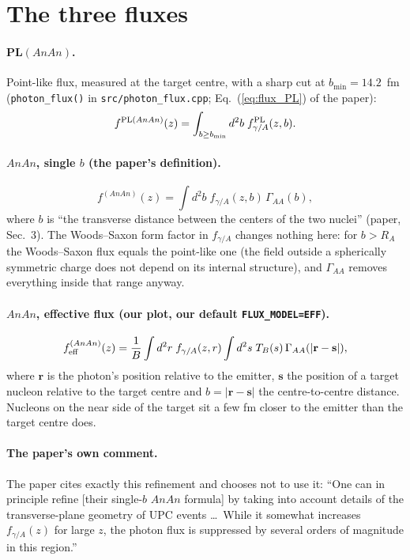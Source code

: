 \documentclass[11pt]{article}
\begin{document}
\section{The three fluxes}

\paragraph{PL$(AnAn)$.} Point-like flux, measured at the target centre,
with a sharp cut at $b_{\min}=14.2$~fm (\texttt{photon\_flux()} in
\texttt{src/photon\_flux.cpp}; Eq.~(\ref{eq:flux_PL}) of the paper):
\begin{equation}
  f^{{\rm PL}(AnAn)}(z) = \int_{b\ge b_{\min}} d^2b\; f^{\rm PL}_{\gamma/A}(z,b).
  \label{eq:flux_PL}
\end{equation}

\paragraph{$AnAn$, single $b$ (the paper's definition).}
\begin{equation}
  f^{(AnAn)}(z) = \int d^2b\; f_{\gamma/A}(z,b)\,\Gamma_{AA}(b),
\end{equation}
where $b$ is ``the transverse distance between the centers of the two
nuclei'' (paper, Sec.~3). The Woods--Saxon form factor in $f_{\gamma/A}$
changes nothing here: for $b>R_A$ the Woods--Saxon flux equals the
point-like one (the field outside a spherically symmetric charge does not
depend on its internal structure), and $\Gamma_{AA}$ removes everything
inside that range anyway.

\paragraph{$AnAn$, effective flux (our plot, our default \texttt{FLUX\_MODEL=EFF}).}
\begin{equation}
  f^{(AnAn)}_{\rm eff}(z) = \frac{1}{B}\int d^2r\; f_{\gamma/A}(z,r)
  \int d^2s\; T_B(s)\,\Gamma_{AA}(|\mathbf r-\mathbf s|),
\end{equation}
where $\mathbf r$ is the photon's position relative to the emitter,
$\mathbf s$ the position of a target nucleon relative to the target centre
and $b=|\mathbf r-\mathbf s|$ the centre-to-centre distance. Nucleons on the
near side of the target sit a few fm closer to the emitter than the target
centre does.

\paragraph{The paper's own comment.} The paper cites exactly this
refinement and chooses not to use it: ``One can in principle refine
[their single-$b$ $AnAn$ formula] by taking into account details of the
transverse-plane geometry of UPC events \dots\ While it somewhat increases
$f_{\gamma/A}(z)$ for large $z$, the photon flux is suppressed by several
orders of magnitude in this region.''
\end{document}
